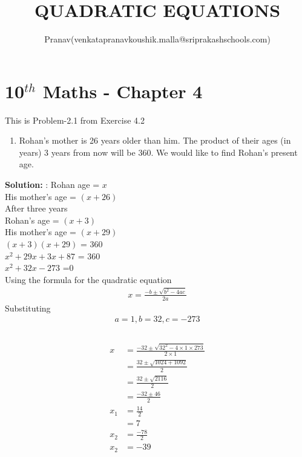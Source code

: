 \documentclass[10pt]{article}
\title{QUADRATIC EQUATIONS}
\author{Pranav(venkatapranavkoushik.malla@sriprakashschools.com)}
\newcommand{\solution}{\noindent \textbf{Solution: }}
\begin{document}
    \maketitle
    \section*{10$^{th}$ Maths - Chapter 4}
    This is Problem-2.1 from Exercise 4.2
\begin{enumerate}
    \item Rohan’s mother is 26 years older than him. The product of their ages (in years)
3 years from now will be 360. We would like to find Rohan’s present age.
\end{enumerate}
\solution: Rohan age = $x$\\
His mother's age = $(x+26)$\\
After three years\\
Rohan's age = $(x+3)$\\
His mother's age = $(x+29)$\\ 
$(x+3)(x+29)$ = 360\\
$x^2+29x+3x+87$ = 360\\
$x^2+32x-273$ =0\\
Using the formula for the quadratic equation
\begin{align}
x = \frac{-b \pm \sqrt{b^2-4ac}}{2a}
\end{align}
Substituting
\begin{align}
a=1,b=32,c=-273\\
\end{align}
\\
\begin{align}
x&= \frac{-32\pm\sqrt{32^2-4\times 1 \times 273}}{2\times 1}\\
 &= \frac{32\pm\sqrt{1024+1092}}{2}\\
 &= \frac{32\pm\sqrt{2116}}{2}\\
 &= \frac{-32\pm46}{2}\\
 x_1&= \frac{14}{2}\\
 &= 7\\
 x_2&=\frac{-78}{2}\\
 x_2&=-39\\
\end{align}
\end{document}
